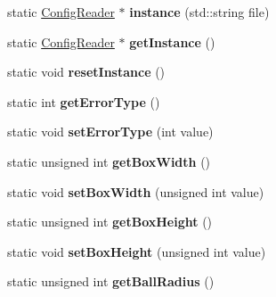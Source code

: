 \begin{DoxyCompactItemize}
\item 
\hypertarget{class_config_reader_a6ab006314dd46b2f45dfa9aa0dc54a5e}{static \hyperlink{class_config_reader}{Config\+Reader} $\ast$ {\bfseries instance} (std\+::string file)}\label{class_config_reader_a6ab006314dd46b2f45dfa9aa0dc54a5e}

\item 
\hypertarget{class_config_reader_adcd7c11a5af6e062f96201302c2a90b0}{static \hyperlink{class_config_reader}{Config\+Reader} $\ast$ {\bfseries get\+Instance} ()}\label{class_config_reader_adcd7c11a5af6e062f96201302c2a90b0}

\item 
\hypertarget{class_config_reader_a00d4c07a9db83e46b80706244f8593d4}{static void {\bfseries reset\+Instance} ()}\label{class_config_reader_a00d4c07a9db83e46b80706244f8593d4}

\item 
\hypertarget{class_config_reader_ae99663a4e3b247c3b02516d0afaa53a2}{static int {\bfseries get\+Error\+Type} ()}\label{class_config_reader_ae99663a4e3b247c3b02516d0afaa53a2}

\item 
\hypertarget{class_config_reader_a9d370f6fc6f1c20634c53ac177a9931e}{static void {\bfseries set\+Error\+Type} (int value)}\label{class_config_reader_a9d370f6fc6f1c20634c53ac177a9931e}

\item 
\hypertarget{class_config_reader_ac7747ef9480689e049acf9c4f4291359}{static unsigned int {\bfseries get\+Box\+Width} ()}\label{class_config_reader_ac7747ef9480689e049acf9c4f4291359}

\item 
\hypertarget{class_config_reader_ab02610cf9b9fd520e5e35ca9dd8a118c}{static void {\bfseries set\+Box\+Width} (unsigned int value)}\label{class_config_reader_ab02610cf9b9fd520e5e35ca9dd8a118c}

\item 
\hypertarget{class_config_reader_aea135da2273cc0f95c2b6b8e8e3881c1}{static unsigned int {\bfseries get\+Box\+Height} ()}\label{class_config_reader_aea135da2273cc0f95c2b6b8e8e3881c1}

\item 
\hypertarget{class_config_reader_ae8ff8190a72fb2a86bc17696bab8a8cf}{static void {\bfseries set\+Box\+Height} (unsigned int value)}\label{class_config_reader_ae8ff8190a72fb2a86bc17696bab8a8cf}

\item 
\hypertarget{class_config_reader_a8d1f3e757706c0c39c6cd76183f30eb3}{static unsigned int {\bfseries get\+Ball\+Radius} ()}\label{class_config_reader_a8d1f3e757706c0c39c6cd76183f30eb3}


\end{DoxyCompactItemize}

